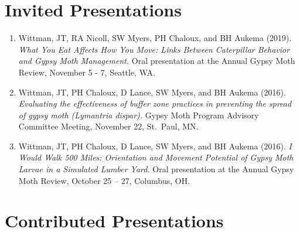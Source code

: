 \documentclass[11pt, a4paper]{awesome-cv}
\providecommand{\tightlist}{%
	\setlength{\itemsep}{0pt}\setlength{\parskip}{0pt}}
\newcounter{papers}
\begin{document}
\newrefcontext[sorting=none]\setcounter{papers}{0}\pagebreak[3]
\printbibliography[category=bib-C:/Users/wittm094/GoogleDrive/school_work/grad_school/CV/CV/bibs/publications.bib-3872946,heading=none]\setcounter{papers}{0}

\nocite{Hallinen2020,
Wittman,
Short,
Stivers2019,
Wittman2019,
Wittman2018,
Wittman2017,
Wittman2013}

\hypertarget{invited-presentations}{%
\section{Invited Presentations}\label{invited-presentations}}

\begin{enumerate}
\def\labelenumi{\arabic{enumi}.}
\tightlist
\item
  Wittman, JT, RA Nicoll, SW Myers, PH Chaloux, and BH Aukema (2019). \emph{What You Eat Affects How You Move: Links Between Caterpillar Behavior and Gypsy Moth Management.} Oral presentation at the Annual Gypsy Moth Review, November 5 - 7, Seattle, WA.
\item
  Wittman, JT, PH Chaloux, D Lance, SW Myers, and BH Aukema (2016). \emph{Evaluating the effectiveness of buffer zone practices in preventing the spread of gypsy moth (Lymantria dispar).} Gypsy Moth Program Advisory Committee Meeting, November 22, St.~Paul, MN.
\item
  Wittman, JT, PH Chaloux, D Lance, SW Myers, and BH Aukema (2016). \emph{I Would Walk 500 Miles: Orientation and Movement Potential of Gypsy Moth Larvae in a Simulated Lumber Yard.} Oral presentation at the Annual Gypsy Moth Review, October 25 -- 27, Columbus, OH.
\end{enumerate}

\hypertarget{contributed-presentations}{%
\section{Contributed Presentations}\label{contributed-presentations}}
\end{document}
